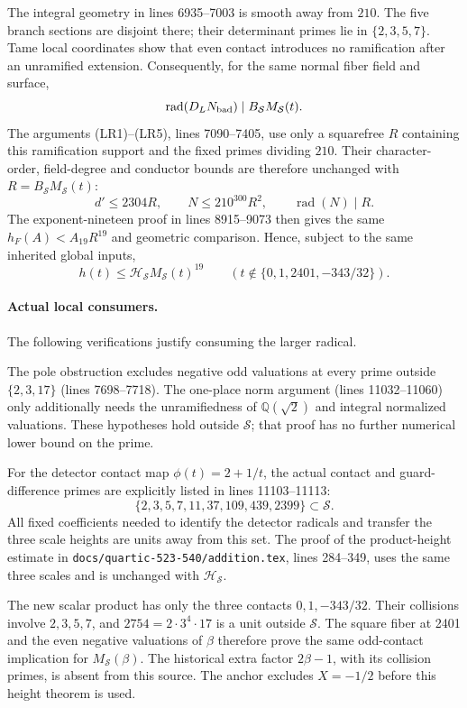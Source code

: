 The integral geometry in lines 6935--7003 is smooth away from $210$.
The five branch sections are disjoint there; their determinant primes
lie in $\{2,3,5,7\}$. Tame local coordinates show that even contact
introduces no ramification after an unramified extension. Consequently,
for the same normal fiber field and surface,
\[
 \operatorname{rad}(D_LN_{\rm bad})
       \mid B_{\mathcal S}M_{\mathcal S}(t).
\]
The arguments (LR1)--(LR5), lines 7090--7405, use only a squarefree
$R$ containing this ramification support and the fixed primes dividing
$210$. Their character-order, field-degree and conductor bounds are
therefore unchanged with $R=B_{\mathcal S}M_{\mathcal S}(t)$:
\[
 d'\le2304R,\qquad N\le210^{300}R^2,
 \qquad\operatorname{rad}(N)\mid R.
\]
The exponent-nineteen proof in lines 8915--9073 then gives the same
$h_F(A)<A_{19}R^{19}$ and geometric comparison. Hence, subject to the
same inherited global inputs,
\[
 h(t)\le\mathcal H_{\mathcal S}M_{\mathcal S}(t)^{19}
 \qquad(t\notin\{0,1,2401,-343/32\}).
\]

\paragraph{Actual local consumers.}
The following verifications justify consuming the larger radical.

The pole obstruction excludes negative odd valuations at every prime
outside $\{2,3,17\}$ (lines 7698--7718). The one-place norm argument
(lines 11032--11060) only additionally needs the unramifiedness of
$\mathbb Q(\sqrt2)$ and integral normalized valuations. These hypotheses
hold outside $\mathcal S$; that proof has no further numerical lower
bound on the prime.

For the detector contact map $\phi(t)=2+1/t$, the actual contact and
guard-difference primes are explicitly listed in lines 11103--11113:
\[
 \{2,3,5,7,11,37,109,439,2399\}\subset\mathcal S.
\]
All fixed coefficients needed to identify the detector radicals and
transfer the three scale heights are units away from this set.
The proof of the product-height estimate in
\texttt{docs/quartic-523-540/addition.tex}, lines 284--349, uses the same
three scales and is unchanged with $\mathcal H_{\mathcal S}$.

The new scalar product has only the three contacts $0,1,-343/32$.
Their collisions involve $2,3,5,7$, and $2754=2\cdot3^4\cdot17$ is a
unit outside $\mathcal S$. The square fiber at 2401 and the even
negative valuations of $\beta$ therefore prove the same odd-contact
implication for $M_{\mathcal S}(\beta)$. The historical extra factor
$2\beta-1$, with its collision primes, is absent from this source.
The anchor excludes $X=-1/2$ before this height theorem is used.

